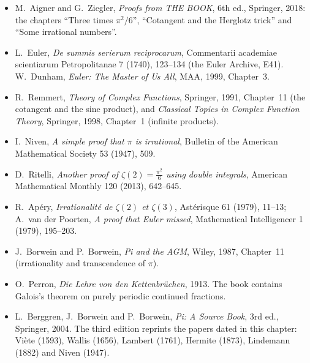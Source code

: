 \begin{itemize}
\item M.~Aigner and G.~Ziegler, \emph{Proofs from THE BOOK}, 6th ed., Springer, 2018: the chapters ``Three times $\pi^2/6$'',
``Cotangent and the Herglotz trick'' and ``Some irrational numbers''.
\item L.~Euler, \emph{De summis serierum reciprocarum}, Commentarii academiae scientiarum Petropolitanae 7 (1740), 123--134
(the Euler Archive, E41). W.~Dunham, \emph{Euler: The Master of Us All}, MAA, 1999, Chapter~3.
\item R.~Remmert, \emph{Theory of Complex Functions}, Springer, 1991, Chapter~11 (the cotangent and the sine product), and
\emph{Classical Topics in Complex Function Theory}, Springer, 1998, Chapter~1 (infinite products).
\item I.~Niven, \emph{A simple proof that $\pi$ is irrational}, Bulletin of the American Mathematical Society 53 (1947), 509.
\item D.~Ritelli, \emph{Another proof of $\zeta(2)=\frac{\pi^2}6$ using double integrals}, American Mathematical Monthly 120
(2013), 642--645.
\item R.~Ap\'ery, \emph{Irrationalit\'e de $\zeta(2)$ et $\zeta(3)$}, Ast\'erisque 61 (1979), 11--13; A.~van der Poorten, \emph{A proof that
Euler missed}, Mathematical Intelligencer 1 (1979), 195--203.
\item J.~Borwein and P.~Borwein, \emph{Pi and the AGM}, Wiley, 1987, Chapter~11 (irrationality and transcendence of $\pi$).
\item O.~Perron, \emph{Die Lehre von den Kettenbr\"uchen}, 1913. The book contains Galois's theorem on purely periodic continued fractions.
\item L.~Berggren, J.~Borwein and P.~Borwein, \emph{Pi: A Source Book}, 3rd ed., Springer, 2004. The third edition reprints the papers dated in this chapter: Vi\`ete (1593), Wallis (1656), Lambert (1761), Hermite (1873), Lindemann (1882) and Niven (1947).
\end{itemize}
